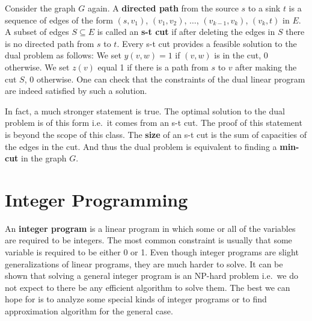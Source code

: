 \documentclass[
]{book}
\theoremstyle{definition}
\theoremstyle{definition}
\theoremstyle{definition}
\theoremstyle{definition}
\theoremstyle{remark}
\begin{document}
Consider the graph \(G\) again.
A \textbf{directed path} from the source \(s\) to a sink \(t\) is a sequence of edges of the form \((s, v_1)\), \((v_1, v_2)\), \(\dots\), \((v_{k-1}, v_k)\), \((v_k, t)\) in \(E\).
A subset of edges \(S \subseteq E\) is called an \textbf{s-t cut} if after deleting the edges in \(S\) there is no directed path from \(s\) to \(t\).
Every s-t cut provides a feasible solution to the dual problem as follows: We set \(y(v, w) = 1\) if \((v, w)\) is in the cut, 0 otherwise. We set \(z(v)\) equal 1 if there is a path from \(s\) to \(v\) after making the cut \(S\), 0 otherwise. One can check that the constraints of the dual linear program are indeed satisfied by such a solution.

In fact, a much stronger statement is true. The optimal solution to the dual problem is of this form i.e.~it comes from an s-t cut.
The proof of this statement is beyond the scope of this class.
The \textbf{size} of an s-t cut is the sum of capacities of the edges in the cut.
And thus the dual problem is equivalent to finding a \textbf{min-cut} in the graph \(G\).

\hypertarget{integer-programming}{%
\chapter{Integer Programming}\label{integer-programming}}

An \textbf{integer program} is a linear program in which some or all of the variables are required to be integers. The most common constraint is usually that some variable is required to be either 0 or 1.
Even though integer programs are slight generalizations of linear programs, they are much harder to solve.
It can be shown that solving a general integer program is an NP-hard problem i.e.~we do not expect to there be any efficient algorithm to solve them.
The best we can hope for is to analyze some special kinds of integer programs or to find approximation algorithm for the general case.
\end{document}
